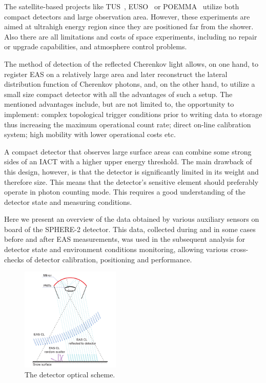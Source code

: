 \documentclass[universe,article,submit,moreauthors,pdftex]{Definitions/mdpi}
\begin{document}
The satellite-based projects like TUS~\cite{TUS2017, TUS2020}, EUSO~\cite{EUSO2015, EUSO2021} or  POEMMA~\cite{POEMMA2021} utilize both compact detectors and large observation area. However, these experiments are aimed at ultrahigh energy region since they are positioned far from the shower. Also there are all limitations and costs of space experiments, including no repair or upgrade capabilities, and atmosphere control problems.

The method of detection of the reflected Cherenkov light allows, on one hand, to register EAS on a relatively large area and later reconstruct the lateral distribution function of Cherenkov photons, and, on the other hand, to utilize a small size compact detector with all the advantages of such a setup. The mentioned advantages include, but are not limited to, the opportunity to implement: complex topological trigger conditions prior to writing data to storage thus increasing the maximum operational count rate; direct on-line calibration system; high mobility with lower operational costs etc.

A compact detector that observes large surface areas can combine some strong sides of an IACT with a higher upper energy threshold. The main drawback of this design, however, is that the detector is significantly limited in its weight and therefore size. This means that the detector's sensitive element should preferably operate in photon counting mode. This requires a good understanding of the detector state and measuring conditions.


Here we present an overview of the data obtained by various auxiliary sensors on board of the SPHERE-2 detector. This data, collected during and in some cases before and after EAS measurements, was used in the subsequent analysis for detector state and environment conditions monitoring, allowing various cross-checks of detector calibration, positioning and performance.

\begin{figure}[bt]
\centering
    \includegraphics[width=0.42\textwidth]{optics}
    \caption{The detector optical scheme.}
\label{fig:optics}
\end{figure}
\end{document}
